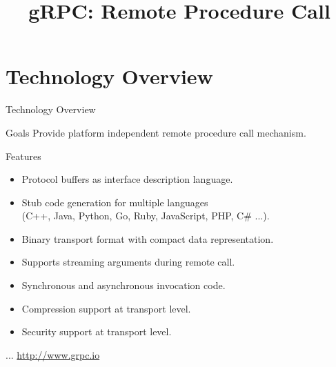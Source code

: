 \RequirePackage{slides-shared}
\title{gRPC: Remote Procedure Call}



\makepreamble

\section{Technology Overview}


%


\begin{frame}{Technology Overview}
    \begin{block}{Goals}
        Provide platform independent remote procedure call mechanism.
    \end{block}

    \bigskip

    \begin{block}{Features}
        \begin{itemize}
            \item Protocol buffers as interface description language.
            \item Stub code generation for multiple languages \\
                  (C++, Java, Python, Go, Ruby, JavaScript, PHP, C\# ...).
            \item Binary transport format with compact data representation.
            \item Supports streaming arguments during remote call.
            \item Synchronous and asynchronous invocation code.
            \item Compression support at transport level.
            \item Security support at transport level.
        \end{itemize}
    \end{block}

    \bigskip

    \hfill ... \url{http://www.grpc.io}
\end{frame}


